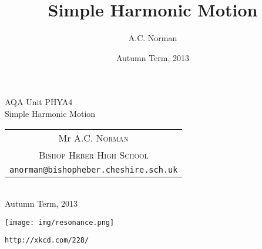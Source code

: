 \documentclass[a4paper,nohyper,12pt]{tufte-book}
\title{Simple Harmonic Motion}
\author{A.C. Norman}
\date{Autumn Term, 2013}
\begin{document}
\begin{titlepage}

\begin{fullwidth}

  \begin{center}
\vfill
    {\fontsize{32}{36}\selectfont AQA Unit PHYA4\\Simple Harmonic Motion\\}
    \vspace*{2em}
            {\LARGE
              \vspace{.75em}
              \begin{tabular}[t]{c}
                Mr \textsc{A.C. Norman}\\
                \textsc{Bishop Heber High School}\\ 
                \texttt{anorman@bishopheber.cheshire.sch.uk}
            \end{tabular}}\\
            \vspace{1.5em}
                   {\Large Autumn Term, 2013}
  \end{center}
  
\thispagestyle{empty}

\vfill

\begin{center}
\noindent\texttt{[image: img/resonance.png]} 

\begin{flushright}
\texttt{http://xkcd.com/228/}
\end{flushright}
\end{center}

\vfill

\end{fullwidth}

\normalsize

\end{titlepage}
\newpage

\thispagestyle{empty}
\addtocounter{page}{-2}
\end{document}
